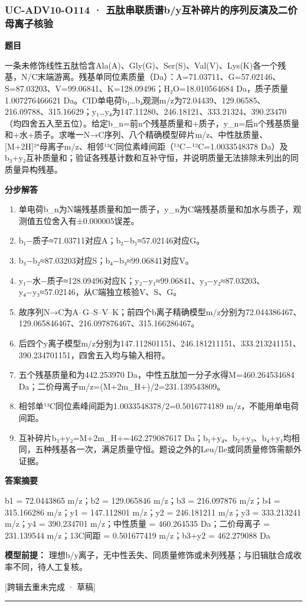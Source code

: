 \documentclass[UTF8,11pt,a4paper]{ctexart}
\begin{document}
\subsubsection*{UC-ADV10-O114 · 五肽串联质谱b/y互补碎片的序列反演及二价母离子核验}
\noindent\textbf{题目}\par
一条未修饰线性五肽恰含Ala(A)、Gly(G)、Ser(S)、Val(V)、Lys(K)各一个残基，N/C末端游离。残基单同位素质量（Da）：A=71.03711、G=57.02146、S=87.03203、V=99.06841、K=128.09496；H₂O=18.010564684 Da，质子质量1.007276466621 Da。CID单电荷b₁…b₄观测m/z为72.04439、129.06585、216.09788、315.16629；y₁…y₄为147.11280、246.18121、333.21324、390.23470（均四舍五入至五位）。给定b\_n=前n个残基质量和+质子，y\_n=后n个残基质量和+水+质子。求唯一N→C序列、八个精确模型碎片m/z、中性肽质量、[M+2H]²⁺母离子m/z、相邻¹³C同位素峰间距（¹³C−¹²C=1.0033548378 Da）及b₃+y₂互补质量和；验证各残基计数和互补守恒，并说明质量无法排除未列出的同质量异构残基。\par
\medskip\noindent\textbf{分步解答}
\begin{enumerate}
\item 单电荷b\_n为N端残基质量和加一质子，y\_n为C端残基质量和加水与质子，观测值五位舍入有±0.000005误差。
\item b₁−质子≈71.03711对应A；b₂−b₁≈57.02146对应G。
\item b₃−b₂≈87.03203对应S；b₄−b₃≈99.06841对应V。
\item y₁−水−质子≈128.09496对应K；y₂−y₁≈99.06841、y₃−y₂≈87.03203、y₄−y₃≈57.02146，从C端独立核验V、S、G。
\item 故序列N→C为A–G–S–V–K；前四个b离子精确模型m/z分别为72.044386467、129.065846467、216.097876467、315.166286467。
\item 后四个y离子模型m/z分别为147.112801151、246.181211151、333.213241151、390.234701151，四舍五入均与输入相符。
\item 五个残基质量和为442.253970 Da，中性五肽加一分子水得M=460.264534684 Da；二价母离子m/z=(M+2m\_H+)/2=231.139543809。
\item 相邻单¹³C同位素峰间距为1.0033548378/2=0.5016774189 m/z，不能用单电荷间距。
\item 互补碎片b₃+y₂=M+2m\_H+=462.279087617 Da；b₁+y₄、b₂+y₃、b₄+y₁均相同，五种残基各一次，满足质量守恒。题设之外的Leu/Ile或同质量修饰需额外证据。
\end{enumerate}
\noindent\textbf{答案摘要}\par
b1 = 72.0443865 m/z；b2 = 129.065846 m/z；b3 = 216.097876 m/z；b4 = 315.166286 m/z；y1 = 147.112801 m/z；y2 = 246.181211 m/z；y3 = 333.213241 m/z；y4 = 390.234701 m/z；中性质量 = 460.264535 Da；二价母离子 = 231.139544 m/z；13C间距 = 0.501677419 m/z；b3+y2 = 462.279088 Da\par
\noindent\textbf{模型前提：}
理想b/y离子，无中性丢失、同质量修饰或未列残基；与旧辑肽合成收率不同，待人工复核。\par
\noindent\textcolor{red!65!black}{[跨辑去重未完成 · 草稿]} \par
\medskip\hrule\medskip
{}
\end{document}

